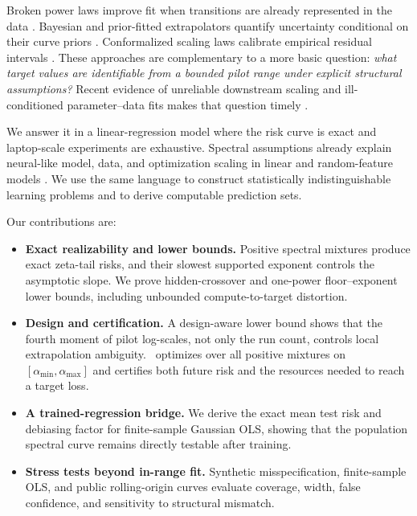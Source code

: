 Broken power laws improve fit when transitions are already represented in the data \citep{caballero2022broken}. Bayesian and prior-fitted extrapolators quantify uncertainty conditional on their curve priors \citep{adriaensen2023efficient,lee2025bayesian}. Conformalized scaling laws calibrate empirical residual intervals \citep{bukkapatnam2026conformalized}. These approaches are complementary to a more basic question: \emph{what target values are identifiable from a bounded pilot range under explicit structural assumptions?} Recent evidence of unreliable downstream scaling and ill-conditioned parameter--data fits makes that question timely \citep{lourie2025unreliable,kricheli2026coverage}.

We answer it in a linear-regression model where the risk curve is exact and laptop-scale experiments are exhaustive. Spectral assumptions already explain neural-like model, data, and optimization scaling in linear and random-feature models \citep{lin2024scaling,bordelon2024dynamical,lin2025improved}. We use the same language to construct statistically indistinguishable learning problems and to derive computable prediction sets.

Our contributions are:
\begin{itemize}
    \item \textbf{Exact realizability and lower bounds.} Positive spectral mixtures produce exact zeta-tail risks, and their slowest supported exponent controls the asymptotic slope. We prove hidden-crossover and one-power floor--exponent lower bounds, including unbounded compute-to-target distortion.
    \item \textbf{Design and certification.} A design-aware lower bound shows that the fourth moment of pilot log-scales, not only the run count, controls local extrapolation ambiguity. \ScaleCert\ optimizes over all positive mixtures on $[\alpha_{\min},\alpha_{\max}]$ and certifies both future risk and the resources needed to reach a target loss.
    \item \textbf{A trained-regression bridge.} We derive the exact mean test risk and debiasing factor for finite-sample Gaussian OLS, showing that the population spectral curve remains directly testable after training.
    \item \textbf{Stress tests beyond in-range fit.} Synthetic misspecification, finite-sample OLS, and public rolling-origin curves evaluate coverage, width, false confidence, and sensitivity to structural mismatch.
\end{itemize}
